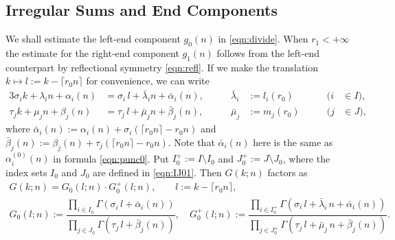 \documentclass[a4paper,12pt]{article}
\theoremstyle{plain}
\def\vG{\varGamma}
\begin{document}
\subsection{Irregular Sums and End Components} \label{subsec:end} 
We shall estimate the left-end component $g_0(n)$ in \eqref{eqn:divide}. 
When $r_1 < +\infty$ the estimate for the right-end component $g_1(n)$ 
follows from the left-end counterpart by reflectional symmetry \eqref{eqn:refl}.   
If we make the translation $k \mapsto l := k - \lceil r_0 n \rceil$ 
for convenience, we can write   
\begin{alignat*}{3}
\sigma_i k + \lambda_i n + \alpha_i(n) &= \sigma_i \, l + 
\bar{\lambda}_i n + \bar{\alpha}_i(n),  \qquad & 
\bar{\lambda}_i &:= l_i(r_0) \qquad & (i & \in I),   \\ 
\tau_j k + \mu_j n + \beta_j(n) &= \tau_j \, l + 
\bar{\mu}_j n + \bar{\beta}_j(n), \qquad & 
\bar{\mu}_j &:= m_j(r_0) \qquad & (j & \in J),  
\end{alignat*} 
where $\bar{\alpha}_i(n) :=\alpha_i(n) + \sigma_i (\lceil r_0 n \rceil - r_0 n) $ and  
$\bar{\beta}_j(n) := \beta_j(n) + \tau_j (\lceil r_0 n \rceil - r_0 n)$. 
Note that $\bar{\alpha}_i(n)$ here is the same as $\alpha_i^{(0)}(n)$ in 
formula \eqref{eqn:punc0}.  
Put $I_0^+ := I \setminus I_0$ and $J_0^+ := J \setminus J_0$, 
where the index sets $I_0$ and $J_0$ are defined in \eqref{eqn:IJ01}.   
Then $G(k; n)$ factors as 
\begin{subequations} \label{eqn:G0}
\begin{gather} 
G(k; n) = G_0( l; n) \cdot G_0^+( l ; n),  \qquad  l := k - \lceil r_0 n \rceil, 
\label{eqn:G=G0p} \\[2mm]   
G_0(l; n) := \dfrac{\prod_{i \in I_0}
\vG( \sigma_i \, l + \bar{\alpha}_i(n))}{\prod_{j \in J_0} 
\vG( \tau_j \, l + \bar{\beta}_j(n))}, \quad 
G_0^+(l; n) := \dfrac{\prod_{i \in I_0^+}
 \vG( \sigma_i \, l + \bar{\lambda}_i \, n + 
\bar{\alpha}_i(n))}{\prod_{j \in J_0^+} \vG( \tau_j \, l + 
\bar{\mu}_j \, n + \bar{\beta}_j(n))}.    \label{eqn:G0p}  
\end{gather}
\end{subequations}  
\end{document}
